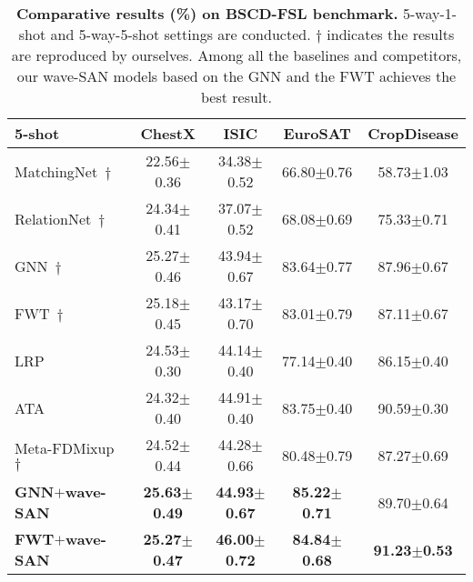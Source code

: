 \documentclass{article}
\newcommand{\mypm}{\scriptsize$\pm$}
\begin{document}
\begin{table*}[h]
\begin{center}
\begin{tabular}{lcccc}
\hline
\hline

\textbf{5-shot} & \textbf{ChestX}  & \textbf{ISIC} & \textbf{EuroSAT} & \textbf{CropDisease} \\ \hline

MatchingNet~\cite{vinyals2016matching}$\dagger$& 22.56\mypm0.36 & 34.38\mypm0.52 &  66.80\mypm0.76 & 58.73\mypm1.03 \\


RelationNet~\cite{sung2018learning}$\dagger$ & 24.34\mypm0.41 & 37.07\mypm0.52 & 68.08\mypm0.69 & 75.33\mypm0.71 \\


GNN~\cite{garcia2017few}$\dagger$ & 25.27\mypm0.46 &  43.94\mypm0.67 & 83.64\mypm0.77 & 87.96\mypm0.67 \\ 
\hline



FWT~\cite{tseng2020cross}$\dagger$ & 25.18\mypm0.45  & 43.17\mypm0.70 & 83.01\mypm0.79 & 87.11\mypm0.67 \\ 

LRP~\cite{sun2021explanation} & 24.53\mypm0.30 & 44.14\mypm0.40 & 77.14\mypm0.40  & 86.15\mypm0.40 \\

ATA~\cite{wang2021cross} & 24.32\mypm0.40 & 44.91\mypm0.40 & 83.75\mypm0.40 & 90.59\mypm0.30 \\

Meta-FDMixup~\cite{fu2021meta}$\dagger$ & 24.52\mypm0.44  & 44.28\mypm 0.66 & 80.48\mypm 0.79 & 87.27\mypm0.69 \\
\hline
\textbf{GNN$+$wave-SAN} 
             & \textbf{25.63\mypm0.49} & \textbf{44.93\mypm0.67} & \textbf{85.22\mypm0.71} &
             89.70\mypm0.64 \\
             
\textbf{FWT$+$wave-SAN} 
             & 
             \textbf{25.27\mypm0.47} 
             & \textbf{46.00\mypm0.72}  & \textbf{84.84\mypm0.68} & \textbf{91.23\mypm0.53} \\ 
\bottomrule
\end{tabular}
\end{center}
\caption{ \textbf{Comparative results (\%) on  BSCD-FSL benchmark.} 5-way-1-shot and 5-way-5-shot settings are conducted. $\dagger$ indicates the results are reproduced by ourselves. Among all the baselines and competitors, our wave-SAN models based on the GNN and the FWT achieves the best result.}
\label{tab:bscd}
\end{table*}
\end{document}
